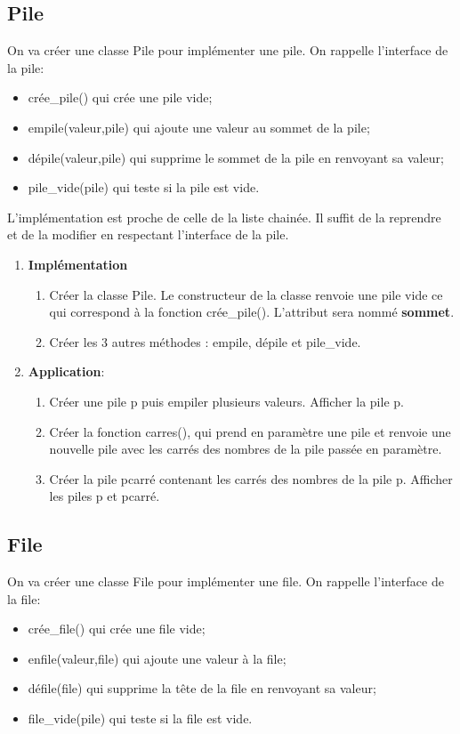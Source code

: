 \documentclass[11pt,a4paper]{article}
\begin{document}
\subsection{Pile}
On va créer une classe Pile pour implémenter une pile. On rappelle l'interface de la pile:
\begin{itemize}
\item crée\_pile() qui crée une pile vide;
\item empile(valeur,pile) qui ajoute une valeur au sommet de la pile;
\item dépile(valeur,pile) qui supprime le sommet de la pile en renvoyant sa valeur;
\item pile\_vide(pile) qui teste si la pile est vide.
\end{itemize}\medskip

L'implémentation est proche de celle de la liste chainée. Il suffit de la reprendre et de la modifier en respectant l'interface de la pile.

\begin{enumerate}
\item \textbf{Implémentation} 
\begin{enumerate}
\item Créer la classe Pile. Le constructeur de la classe renvoie une pile vide ce qui correspond à la fonction crée\_pile(). L'attribut sera nommé \textbf{sommet}.
\item Créer les 3 autres méthodes : empile, dépile et pile\_vide.
\end{enumerate}
\item \textbf{Application}:
\begin{enumerate}
\item Créer une pile p puis empiler plusieurs valeurs. Afficher la pile p.
\item Créer la fonction carres(), qui prend en paramètre une pile et renvoie une nouvelle pile avec les carrés des nombres de la pile passée en paramètre.
\item Créer la pile pcarré contenant les carrés des nombres de la pile p. Afficher les piles p et pcarré.
\end{enumerate}
\end{enumerate}

\subsection{File}
On va créer une classe File pour implémenter une file. On rappelle l'interface de la file:
\begin{itemize}
\item crée\_file() qui crée une file vide;
\item enfile(valeur,file) qui ajoute une valeur à la file;
\item défile(file) qui supprime la tête de la file en renvoyant sa valeur;
\item file\_vide(pile) qui teste si la file est vide.
\end{itemize}\medskip
\end{document}
